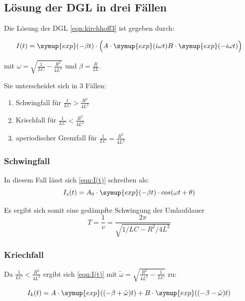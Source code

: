 \subsection{Lösung der DGL in drei Fällen}

Die Lösung der DGL \eqref{eqn:kirchhoff3} ist gegeben durch:

\begin{equation}
  I(t) = \symup{exp}(-\beta t) \cdot \Bigl( A \cdot \symup{exp}(i \omega t) B \cdot \symup{exp}(-i \omega t) \Bigr)
  \label{eqn:I(t)}
\end{equation}

mit $\omega = \sqrt{\frac{1}{LC} - \frac{R^2}{4L^2}}$ und $\beta = \frac{R}{2L}$.

Sie unterscheidet sich in 3 Fällen:

\begin{enumerate}
  \item Schwingfall für $\frac{1}{LC} > \frac{R^2}{4L^2}$
  \item Kriechfall für $\frac{1}{LC} < \frac{R^2}{4L^2}$
  \item aperiodischer Grenzfall für $\frac{1}{LC} = \frac{R^2}{4L^2}$
\end{enumerate}

\subsubsection{Schwingfall}
In diesem Fall lässt sich \eqref{eqn:I(t)} schreiben als:
\begin{equation}
  I_s(t)= A_0 \cdot \symup{exp}(-\beta t) \cdot cos(\omega t + \theta)
  \label{eqn:Schwing(t)}
\end{equation}

Es ergibt sich somit eine gedämpfte Schwingung der Umlaufdauer
\begin{equation*}
T= \frac{1}{v} = \frac{2\pi}{\sqrt{1/LC-R^2/4L^2}}
\end{equation*}
\subsubsection{Kriechfall}
Da $\frac{1}{LC} < \frac{R^2}{4L^2}$ ergibt sich \eqref{eqn:I(t)}  mit $\tilde{\omega} = \sqrt{\frac{R^2}{4L^2} - \frac{1}{LC}}$ zu:

\begin{equation}
  I_k(t) = A \cdot \symup{exp}((-\beta + \tilde{\omega}) t) + B \cdot \symup{exp}((-\beta - \tilde{\omega}) t)
  \label{eqn:Kriech(t)}
\end{equation}

